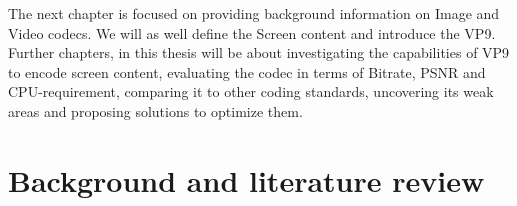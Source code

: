 \documentclass[a4paper,11pt,oneside]{article}
\begin{document}
\indent The next chapter is focused on providing background information on Image and Video codecs. We will as well define the Screen content and introduce the VP9. Further chapters, in this thesis will be about investigating the capabilities of VP9 to encode screen content, evaluating the codec in terms of Bitrate, PSNR and CPU-requirement, comparing it to other coding standards, uncovering its weak areas and proposing solutions to optimize them.\\

\newpage
\section{Background and literature review}
\end{document}
